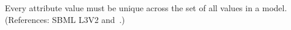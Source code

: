 Every  attribute value must be unique across the set of all
 values in a model.  (References: SBML L3V2
 and~.)
